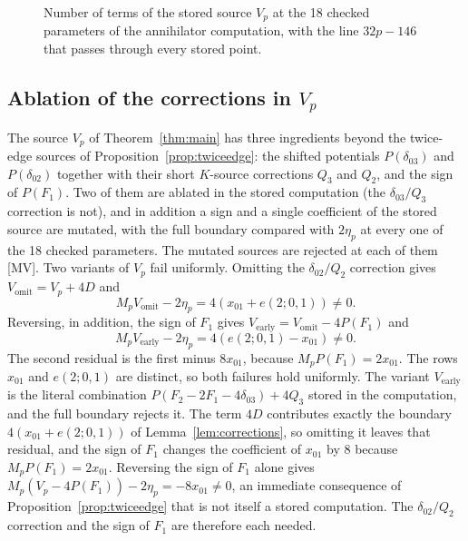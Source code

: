 \documentclass[11pt]{article}
\theoremstyle{definition}
\theoremstyle{remark}
\begin{document}
\begin{figure}[t]
\centering
{}
\caption{Number of terms of the stored source $V_p$ at the 18 checked parameters of the annihilator computation, with the line $32p-146$ that passes through every stored point.}
\label{fig:supportlaw}
\end{figure}

\subsection{Ablation of the corrections in \texorpdfstring{$V_p$}{V\_p}}

The source $V_p$ of Theorem~\ref{thm:main} has three ingredients beyond the
twice-edge sources of Proposition~\ref{prop:twiceedge}: the shifted potentials
$P(\delta_{03})$ and $P(\delta_{02})$ together with their short $K$-source
corrections $Q_3$ and $Q_2$, and the sign of $P(F_1)$. Two of them are ablated in the stored computation (the $\delta_{03}/Q_3$ correction is not), and in addition a sign and a single
coefficient of the stored source are mutated, with the full boundary compared with $2\eta_p$ at
every one of the 18 checked parameters. The mutated sources are rejected at each of them [MV]. Two variants of
$V_p$ fail uniformly. Omitting the $\delta_{02}/Q_2$
correction gives $V_{\mathrm{omit}}=V_p+4D$ and
\[
 M_pV_{\mathrm{omit}}-2\eta_p=4(x_{01}+e(2;0,1))\ne0.
\]
Reversing, in addition, the sign of $F_1$ gives
$V_{\mathrm{early}}=V_{\mathrm{omit}}-4P(F_1)$ and
\[
 M_pV_{\mathrm{early}}-2\eta_p=4(e(2;0,1)-x_{01})\ne0.
\]
The second residual is the first minus $8x_{01}$, because
$M_pP(F_1)=2x_{01}$. The rows $x_{01}$ and $e(2;0,1)$ are distinct, so both failures hold uniformly.
The variant $V_{\mathrm{early}}$ is the literal combination
$P(F_2-2F_1-4\delta_{03})+4Q_3$ stored in the computation, and the full boundary rejects it. The term
$4D$ contributes exactly the boundary $4(x_{01}+e(2;0,1))$ of Lemma~\ref{lem:corrections}, so omitting it
leaves that residual, and the sign of $F_1$ changes the coefficient of $x_{01}$ by $8$ because
$M_pP(F_1)=2x_{01}$. Reversing the sign of $F_1$ alone gives $M_p(V_p-4P(F_1))-2\eta_p=-8x_{01}\neq0$, an immediate consequence of Proposition~\ref{prop:twiceedge} that is not itself a stored computation. The $\delta_{02}/Q_2$ correction and the sign of $F_1$ are therefore each needed.
\end{document}
